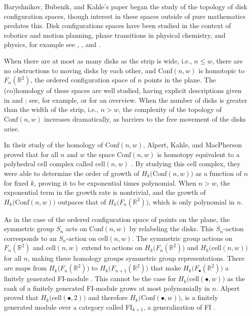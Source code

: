 \documentclass[12py]{amsart}%
\theoremstyle{definition}\newtheorem{definition}[thm]{Definition}
\theoremstyle{definition}
\newcommand{\R}{\ensuremath{\mathbb{R}}}
\begin{document}
Baryshnikov, Bubenik, and Kahle's paper \cite{BBK} began the study of the topology of disk configuration spaces, though interest in these spaces outside of pure mathematics predates this. Disk configurations spaces have been studied in the context of robotics and motion planning, phase transitions in physical chemistry, and physics, for example see \cite{farber2008invitation}, \cite{diaconis2009markov}, and \cite{carlsson2012computational}.

When there are at most as many disks as the strip is wide, i.e., $n\le w$, there are no obstructions to moving disks by each other, and $\text{Conf}(n,w)$ is homotopic to $F_{n}(\R^{2})$, the ordered configuration space of $n$ points in the plane. The (co)homology of these spaces are well studied, having explicit descriptions given in \cite{arnold1969cohomology} and \cite{cohen2007homology}; see, for example, \cite{knudsen2018configuration} or \cite{sinha2006homology} for an overview. When the number of disks is greater than the width of the strip, i.e., $n>w$, the complexity of the topology of $\text{Conf}(n,w)$ increases dramatically, as barriers to the free movement of the disks arise.

In their study of the homology of $\text{Conf}(n,w)$, Alpert, Kahle, and MacPherson proved that for all $n$ and $w$ the space $\text{Conf}(n,w)$ is homotopy equivalent to a polyhedral cell complex called  $\text{cell}(n,w)$ \cite[Theorem 3.1]{alpert2021configuration}. By studying this cell complex, they were able to determine the order of growth of $H_{k}\big(\text{Conf}(n,w)\big)$ as a function of $n$ for fixed $k$, proving it to be exponential times polynomial. When $n>w$, the exponential term in the growth rate is nontrivial, and the growth of $H_{k}\big(\text{Conf}(n,w)\big)$ outpaces that of $H_{k}\big(F_{n}(\R^{2})\big)$, which is only polynomial in $n$. 

As in the case of the ordered configuration space of points on the plane, the symmetric group $S_{n}$ acts on $\text{Conf}(n,w)$ by relabeling the disks. This $S_{n}$-action corresponds to an $S_{n}$-action on $\text{cell}(n,w)$. The symmetric group actions on $F_{n}(\R^{2})$ and $\text{cell}(n,w)$ extend to actions on $H_{k}\big(F_{n}(\R^{2})\big)$ and $H_{k}\big(\text{cell}(n,w)\big)$ for all $n$, making these homology groups symmetric group representations. There are maps from $H_{k}\big(F_{n}(\R^{2})\big)$ to $H_{k}\big(F_{n+1}(\R^{2})\big)$ that make $H_{k}\big(F_{\bullet}(\R^{2})\big)$ a finitely generated FI-module \cite[Theorem 6.4.3]{church2015fi}. This cannot be the case for $H_{k}\big(\text{cell}(\bullet,w)\big)$ as the rank of a finitely generated FI-module grows at most polynomially in $n$. Alpert proved that $H_{k}\big(\text{cell}(\bullet,2)\big)$ and therefore $H_{k}\big(\text{Conf}(\bullet,w)\big)$, is a finitely generated module over a category called FI$_{k+1}$, a generalization of FI \cite[Theorem 6.1]{alpert2020generalized}.
\end{document}
